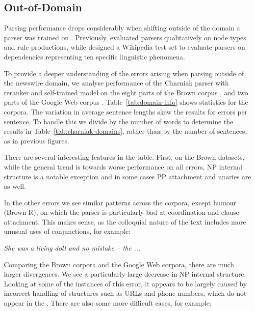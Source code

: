 \subsection{Out-of-Domain}

Parsing performance drops considerably when shifting outside of the domain a
parser was trained on \parencite{Gildea:2001}.
Previously, \textcite{Clegg:2005:EIT:1626315.1626317} evaluated parsers qualitatively on
node types and rule productions, while  \textcite{Bender:2011:PEO:2145432.2145479}
designed a Wikipedia test set to evaluate parsers on dependencies representing
ten specific linguistic phenomena.

To provide a deeper understanding of the errors arising when parsing outside of
the newswire domain, we analyse performance of the Charniak parser with
reranker and self-trained model on the eight parts of the Brown corpus
\parencite{ptb}, and two parts of the Google Web
corpus \parencite{Petrov:2012}.  Table~\ref{tab:domain-info} shows statistics for
the corpora.  The variation in average sentence lengths skew the results for
errors per sentence.  To handle this we divide by the number of words to
determine the results in Table~\ref{tab:charniak-domains}, rather than by the
number of sentences, as in previous figures.

There are several interesting features in the table.  First, on the Brown
datasets, while the general trend is towards worse performance on all errors,
NP internal structure is a notable exception and in some cases PP attachment
and unaries are as well.

In the other errors we see similar patterns across the corpora, except humour
(Brown R), on which the parser is particularly bad at coordination and clause
attachment.  This makes sense, as the colloquial nature of the text includes
more unusual uses of conjunctions, for example:

\vspace{3mm}
\emph{She was a living doll and no mistake -- the ... }
\vspace{3mm}

Comparing the Brown corpora and the Google Web corpora, there are much larger
divergences.  We see a particularly large decrease in NP internal structure.
Looking at some of the instances of this error, it appears to be largely caused
by incorrect handling of structures such as URLs and phone numbers, which do
not appear in the \ptb.  There are also some more difficult cases, for example:

